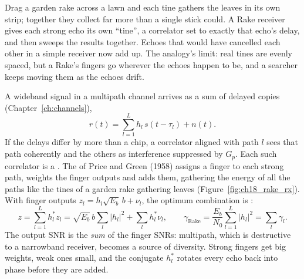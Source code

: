 
\begin{analogy}
Drag a garden rake across a lawn and each tine gathers the leaves in its own strip; together they
collect far more than a single stick could. A Rake receiver gives each strong echo its own
``tine'', a correlator set to exactly that echo's delay, and then sweeps the results together.
Echoes that would have cancelled each other in a simple receiver now add up. The analogy's limit:
real tines are evenly spaced, but a Rake's fingers go wherever the echoes happen to be, and a
searcher keeps moving them as the echoes drift.
\end{analogy}

A wideband signal in a multipath channel arrives as a sum of delayed copies
(Chapter~\ref{ch:channels}),
\begin{equation}
r(t)=\sum_{l=1}^{L}h_l\,s(t-\tau_l)+n(t).
\end{equation}
If the delays differ by more than a chip, a correlator aligned with path $l$ sees that path
coherently and the others as interference suppressed by $G_p$. Each such correlator is a
. The  of Price and Green (1958) assigns a finger to each
strong path, weights the finger outputs and adds them, gathering the energy of all the paths
like the tines of a garden rake gathering leaves (Figure~\ref{fig:ch18_rake_rx}). With finger
outputs $z_l=h_l\sqrt{E_b}\,b+\nu_l$, the optimum combination is :
\begin{equation}
z=\sum_{l=1}^Lh_l^*z_l=\sqrt{E_b}\,b\sum_l|h_l|^2+\sum_lh_l^*\nu_l,
\qquad
\gamma_{\text{Rake}}=\frac{E_b}{N_0}\sum_{l=1}^L|h_l|^2=\sum_l\gamma_l.
\label{eq:ch18:mrc}
\end{equation}
The output SNR is the \emph{sum} of the finger SNRs: multipath, which is destructive to a
narrowband receiver, becomes a source of diversity. Strong fingers get big weights, weak ones
small, and the conjugate $h_l^*$ rotates every echo back into phase before they are added.



